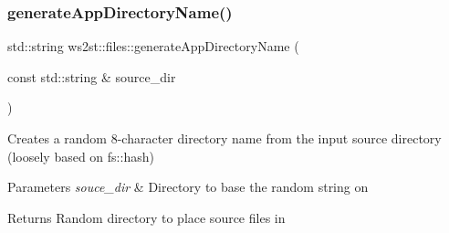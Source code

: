 \subsubsection{\texorpdfstring{generate\+App\+Directory\+Name()}{generateAppDirectoryName()}}
{\footnotesize\ttfamily std\+::string ws2st\+::files\+::generate\+App\+Directory\+Name (\begin{DoxyParamCaption}\item[{const std\+::string \&}]{source\+\_\+dir }\end{DoxyParamCaption})}



Creates a random 8-\/character directory name from the input source directory (loosely based on fs\+::hash) 


\begin{DoxyParams}{Parameters}
{\em souce\+\_\+dir} & Directory to base the random string on \\
\hline
\end{DoxyParams}
\begin{DoxyReturn}{Returns}
Random directory to place source files in 
\end{DoxyReturn}

